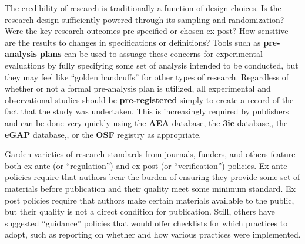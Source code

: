 The credibility of research is traditionally a function of design choices.\cite{angrist2010credibility,ioannidis2005most}
Is the research design sufficiently powered through its sampling and randomization?
Were the key research outcomes pre-specified or chosen ex-post?
How sensitive are the results to changes in specifications or definitions?
Tools such as \textbf{pre-analysis plans}
can be used to assuage these concerns for experimental evaluations
by fully specifying some set of analysis intended to be conducted,
but they may feel like ``golden handcuffs'' for other types of research.\cite{olken2015promises}
Regardless of whether or not a formal pre-analysis plan is utilized,
all experimental and observational studies should be \textbf{pre-registered}
simply to create a record of the fact that the study was undertaken.
This is increasingly required by publishers and can be done very quickly
using the \textbf{AEA} database,
the \textbf{3ie} database,,
the \textbf{eGAP} database,,
or the \textbf{OSF} registry as appropriate.

Garden varieties of research standards from journals, funders, and others feature both ex ante
(or ``regulation'') and ex post (or ``verification'') policies.
Ex ante policies require that authors bear the burden
of ensuring they provide some set of materials before publication
and their quality meet some minimum standard.
Ex post policies require that authors make certain materials available to the public,
but their quality is not a direct condition for publication.
Still, others have suggested ``guidance'' policies that would offer checklists
for which practices to adopt, such as reporting on whether and how
various practices were implemented.

